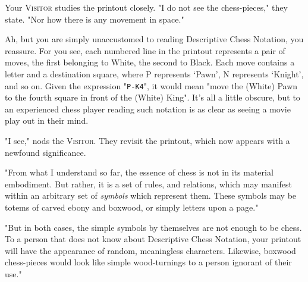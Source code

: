 \begin{center}
\end{center}

\noindent
Your \textsc{Visitor} studies the printout closely. "I do not see the chess-pieces," they state. "Nor how there is any movement in space."

Ah, but you are simply unaccustomed to reading Descriptive Chess Notation, you reassure. For you see, each numbered line in the printout represents a pair of moves, the first belonging to White, the second to Black. Each move contains a letter and a destination square, where P represents `Pawn', N represents `Knight', and so on. Given the expression "\texttt{P-K4}", it would mean "move the (White) Pawn to the fourth square in front of the (White) King". It's all a little obscure, but to an experienced chess player reading such notation is as clear as seeing a movie play out in their mind.

"I see," nods the \textsc{Visitor}. They revisit the printout, which now appears with a newfound significance.

"From what I understand so far, the essence of chess is not in its material embodiment. But rather, it is a set of rules, and relations, which may manifest within an arbitrary set of \emph{symbols} which represent them. These symbols may be totems of carved ebony and boxwood, or simply letters upon a page."

"But in both cases, the simple symbols by themselves are not enough to be chess. To a person that does not know about Descriptive Chess Notation, your printout will have the appearance of random, meaningless characters. Likewise, boxwood chess-pieces would look like simple wood-turnings to a person ignorant of their use."

